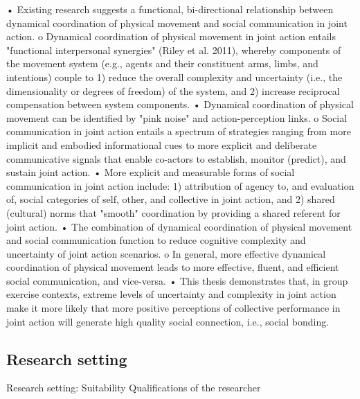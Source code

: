 \begin{CJK}{UTF8}{gbsn}
•	Existing research suggests a functional, bi-directional relationship between dynamical coordination of physical movement and social communication in joint action.
o	Dynamical coordination of physical movement in joint action entails "functional interpersonal synergies" (Riley et al. 2011), whereby components of the movement system (e.g., agents and their constituent arms, limbs, and intentions) couple to 1) reduce the overall complexity and uncertainty (i.e., the dimensionality or degrees of freedom) of the system, and 2) increase reciprocal compensation between system components.
•	Dynamical coordination of physical movement can be identified by "pink noise" and action-perception links.
o	Social communication in joint action entails a spectrum of strategies ranging from more implicit and embodied informational cues to more explicit and deliberate communicative signals that enable co-actors to establish, monitor (predict), and sustain joint action.
•	More explicit and measurable forms of social communication in joint action include: 1) attribution of agency to, and evaluation of, social categories of self, other, and collective in joint action, and 2) shared (cultural) norms that "smooth" coordination by providing a shared referent for joint action.
•	The combination of dynamical coordination of physical movement and social communication function to reduce cognitive complexity and uncertainty of joint action scenarios.
o	In general, more effective dynamical coordination of physical movement leads to more effective, fluent, and efficient social communication, and vice-versa.
•	This thesis demonstrates that, in group exercise contexts, extreme levels of uncertainty and complexity in joint action make it more likely that more positive perceptions of collective performance in joint action will generate high quality social connection, i.e., social bonding.



















\subsection{Research setting}

Research setting:
  Suitability
  Qualifications of the researcher


\end{CJK}
